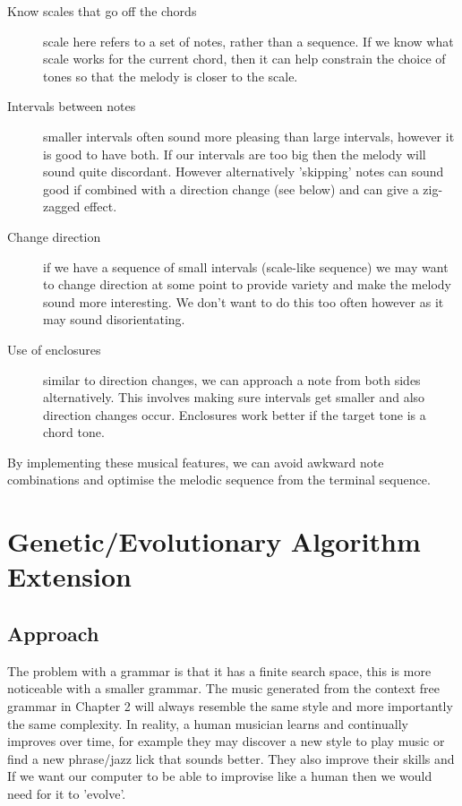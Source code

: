 \documentclass[pdftex,12pt,a4paper]{report}
\begin{document}
\begin{description}
  \item[Know scales that go off the chords] scale here refers to a set of notes, rather than a sequence. If we know what scale works for the current chord, then it can help constrain the choice of tones so that the melody is closer to the scale.
  \item[Intervals between notes] smaller intervals often sound more pleasing than large intervals, however it is good to have both. If our intervals are too big then the melody will sound quite discordant. However alternatively 'skipping' notes can sound good if combined with a direction change (see below) and can give a zig-zagged effect.
  \item[Change direction] if we have a sequence of small intervals (scale-like sequence) we may want to change direction at some point to provide variety and make the melody sound more interesting. We don't want to do this too often however as it may sound disorientating.
  \item[Use of enclosures] similar to direction changes, we can approach a note from both sides alternatively. This involves making sure intervals get smaller and also direction changes occur. Enclosures work better if the target tone is a chord tone.
\end{description}

By implementing these musical features, we can avoid awkward note combinations and optimise the melodic sequence from the terminal sequence.


\chapter{Genetic/Evolutionary Algorithm Extension}

\section{Approach}
The problem with a grammar is that it has a finite search space, this is more noticeable with a smaller grammar. The music generated from the context free grammar in Chapter 2 will always resemble the same style and more importantly the same complexity. In reality, a human musician learns and continually improves over time, for example they may discover a new style to play music or find a new phrase/jazz lick that sounds better. They also improve their skills and  If we want our computer to be able to improvise like a human then we would need for it to 'evolve'.
\end{document}
